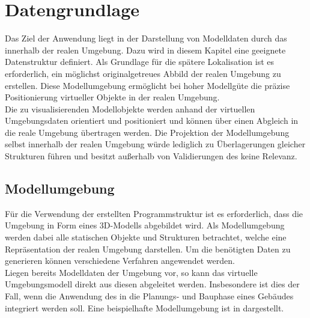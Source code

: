 \chapter{Datengrundlage}
\label{chap.modeldata}

Das Ziel der Anwendung liegt in der Darstellung von Modelldaten durch das \kps{} innerhalb der realen Umgebung. Dazu wird in diesem Kapitel eine geeignete Datenstruktur definiert. Als Grundlage für die spätere Lokalisation ist es erforderlich, ein möglichst originalgetreues Abbild der realen Umgebung zu erstellen. Diese Modellumgebung ermöglicht bei hoher Modellgüte die präzise Positionierung virtueller Objekte in der realen Umgebung.\\

Die zu visualisierenden Modellobjekte werden anhand der virtuellen Umgebungsdaten orientiert und positioniert und können über einen Abgleich in die reale Umgebung übertragen werden. Die Projektion der Modellumgebung selbst innerhalb der realen Umgebung würde lediglich zu Überlagerungen gleicher Strukturen führen und besitzt außerhalb von Validierungen des  keine Relevanz.\\

\section{Modellumgebung}
\label{chap.slam}
Für die Verwendung der erstellten Programmstruktur ist es erforderlich, dass die Umgebung in Form eines 3D-Modells abgebildet wird. Als Modellumgebung werden dabei alle statischen Objekte und Strukturen betrachtet, welche eine Repräsentation der realen Umgebung darstellen. Um die benötigten Daten zu generieren können verschiedene Verfahren angewendet werden.\\
Liegen bereits Modelldaten der Umgebung vor, so kann das virtuelle Umgebungsmodell direkt aus diesen abgeleitet werden. Insbesondere ist dies der Fall, wenn die Anwendung des  in die Planungs- und Bauphase eines Gebäudes integriert werden soll. Eine beispielhafte Modellumgebung ist in  dargestellt.\\

